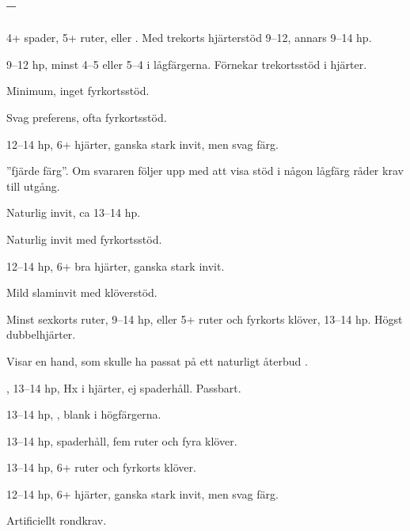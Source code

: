 \subsection{ -- }

\bbe

\item[\spa{1}] 4+ spader, 5+ ruter, eller . Med trekorts
               hjärterstöd 9--12, annars 9--14 hp.
\item[\NT{1}] 9--12 hp, minst 4--5 eller 5--4 i lågfärgerna. Förnekar
             trekortsstöd i hjärter.
   \bbe
      \item[--\pass] Minimum, inget fyrkortsstöd.
      \item[--\la{2}] Svag preferens, ofta fyrkortsstöd.
      \item[--\hj{2}] 12--14 hp, 6+ hjärter, ganska stark invit, men svag färg.
      \item[--\spa{2}] ''fj\"arde f\"arg''. Om svararen följer upp med
                      att visa stöd i någon lågfärg råder krav till utgång.
      \item[--\NT{2}] Naturlig invit, ca 13--14 hp.
      \item[--\la{3}] Naturlig invit med fyrkortsstöd.
      \item[--\hj{3}] 12--14 hp, 6+ bra hjärter, ganska stark invit.
      \item[--\spa{3}] Mild slaminvit med klöverstöd.
    \ebe
\item[\kl{2}] Minst sexkorts ruter, 9--14 hp, eller 5+ ruter och fyrkorts
              klöver, 13--14 hp. Högst dubbelhjärter.
     \bbe
        \item[--\ru{2}] Visar en hand, som skulle ha passat på ett naturligt
                       återbud .
          \bbe
            \item[\hj{2}] , 13--14 hp,
                          Hx i hjärter, ej spaderhåll.
                           Passbart.
            \item[\spa{2}] 13--14 hp, ,
                           blank i högfärgerna.
            \item[\NT{2}] 13--14 hp, spaderhåll, fem ruter och fyra klöver.
            \item[\kl{3}] 13--14 hp, 6+ ruter och fyrkorts klöver.
          \ebe
        \item[--\hj{2}] 12--14 hp, 6+ hjärter, ganska stark invit,
                       men svag färg.
        \item[--\spa{2}] Artificiellt rondkrav.
